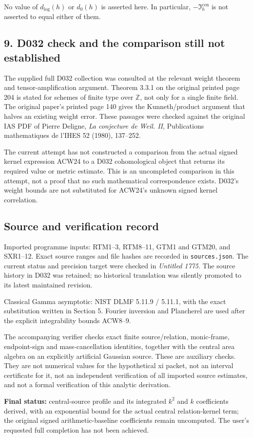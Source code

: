 No value of \(d_{\log}(h)\) or \(d_0(h)\) is asserted here. In particular, \(-\mathfrak I_h^{\mathrm{cen}}\) is not asserted to equal either of them.

\subsection{9. D032 check and the comparison still not established}\label{d032-check-and-the-comparison-still-not-established}

The supplied full D032 collection was consulted at the relevant weight theorem and tensor-amplification argument. Theorem 3.3.1 on the original printed page 204 is stated for schemes of finite type over \(\mathbb Z\), not only for a single finite field. The original paper's printed page 140 gives the Kunneth/product argument that halves an existing weight error. These passages were checked against the original IAS PDF of Pierre Deligne, \emph{La conjecture de Weil. II}, Publications mathematiques de l'IHES 52 (1980), 137--252.

The current attempt has not constructed a comparison from the actual signed kernel expression ACW24 to a D032 cohomological object that returns its required value or metric estimate. This is an uncompleted comparison in this attempt, not a proof that no such mathematical correspondence exists. D032's weight bounds are not substituted for ACW24's unknown signed kernel correlation.

\subsection{Source and verification record}\label{source-and-verification-record}

Imported programme inputs: RTM1--3, RTM8--11, GTM1 and GTM20, and SXR1--12. Exact source ranges and file hashes are recorded in \texttt{sources.json}. The current status and precision target were checked in \emph{Untitled 1775}. The source history in D032 was retained; no historical translation was silently promoted to its latest maintained revision.

Classical Gamma asymptotic: NIST DLMF 5.11.9 / 5.11.1, with the exact substitution written in Section 5. Fourier inversion and Plancherel are used after the explicit integrability bounds ACW8--9.

The accompanying verifier checks exact finite source/relation, monic-frame, endpoint-sign and mass-cancellation identities, together with the central area algebra on an explicitly artificial Gaussian source. These are auxiliary checks. They are not numerical values for the hypothetical xi packet, not an interval certificate for it, not an independent verification of all imported source estimates, and not a formal verification of this analytic derivation.

\textbf{Final status:} central-source profile and its integrated \(k^2\) and \(k\) coefficients derived, with an exponential bound for the actual central relation-kernel term; the original signed arithmetic-baseline coefficients remain uncomputed. The user's requested full completion has not been achieved.
